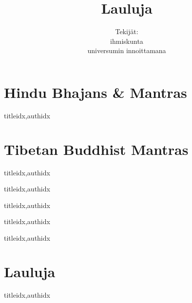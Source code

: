 \documentclass[twoside,10pt,finnish]{book}
\title{Lauluja}
\author{Tekijät: \\
        ihmiskunta \\
        universumin innoittamana}
\begin{document}
  \maketitle
  \tableofcontents %

  \clearpage\scleardpage
    \section{Hindu Bhajans \& Mantras} 
      \begin{songs}{titleidx,authidx}
        \setcounter{songnum}{100}
        
      \end{songs}
     \scleardpage
    \section{Tibetan Buddhist Mantras}
      \begin{songs}{titleidx,authidx}
        \setcounter{songnum}{170}
        
      \end{songs}  
  
  \clearpage\scleardpage
    \begin{songs}{titleidx,authidx}
      \setcounter{songnum}{200}
      
    \end{songs}
    
  \clearpage\scleardpage    
    \begin{songs}{titleidx,authidx}
      \setcounter{songnum}{300}
      
    \end{songs}
  
  \clearpage\scleardpage
    \begin{songs}{titleidx,authidx}
      \setcounter{songnum}{400}
      
    \end{songs}
    
  \clearpage\scleardpage
    \begin{songs}{titleidx,authidx}
      \setcounter{songnum}{500}
      
    \end{songs}      
  
  \clearpage\scleardpage
    \section{Lauluja}
      \begin{songs}{titleidx,authidx}
        \setcounter{songnum}{800}
        
      \end{songs}
\end{document}
